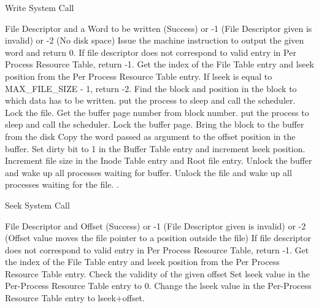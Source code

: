 
\begin{algorithm}
\caption{Write System Call}
\begin{algorithmic}
\REQUIRE File Descriptor and a Word to be written
 (Success) or -1 (File Descriptor given is invalid) or -2 (No disk space)
    \STATE Issue the machine instruction to output the given word and return 0.
\ENDIF
\STATE If file descriptor does not correspond to valid entry in Per Process Resource Table, return -1.
\STATE Get the index of the File Table entry and lseek position from the Per Process Resource Table entry.
\STATE If lseek is equal to MAX\_FILE\_SIZE - 1, return -2.  
\STATE Find the block and position in the block to which data has to be written.
    \STATE put the process to sleep and call the scheduler.
\ENDWHILE
\STATE Lock the file.
\STATE Get the buffer page number from block number.
    \STATE put the process to sleep and call the scheduler.
\ENDWHILE 
\STATE Lock the buffer page.
    \STATE Bring the block to the buffer from the disk
\ENDIF
\STATE Copy the word passed as argument to the offset position in the buffer.  
\STATE Set dirty bit to 1 in the Buffer Table entry and increment lseek position.
\STATE Increment file size in the Inode Table entry and Root file entry.
\STATE Unlock the buffer and wake up all processes waiting for buffer.
\STATE Unlock the file and wake up all processes waiting for the file.
.   
\end{algorithmic}
\end{algorithm}


\begin{algorithm}
\caption{Seek System Call}
\begin{algorithmic}
\REQUIRE File Descriptor and Offset
 (Success) or -1 (File Descriptor given is invalid) or -2 (Offset value moves the file pointer to a position outside the file)
\STATE If file descriptor does not correspond to valid entry in Per Process Resource Table, return -1.
\STATE Get the index of the File Table entry and lseek position from the Per Process Resource Table entry.
\STATE Check the validity of the given offset
    \STATE Set lseek value in the Per-Process Resource Table entry to 0.
\ELSE
    \STATE Change the lseek value in the Per-Process Resource Table entry to lseek+offset.
\ENDIF
{}
\end{algorithmic}
\end{algorithm}

